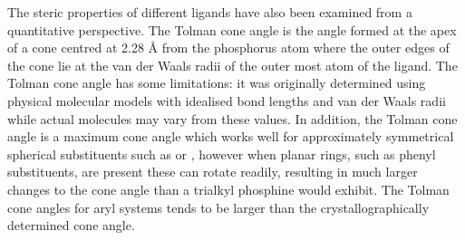 
The steric properties of different ligands have also been examined from a quantitative perspective.  The Tolman cone angle is the angle formed at the apex of a cone centred at 2.28 \si{\angstrom} from the phosphorus atom where the outer edges of the cone lie at the van der Waals radii of the outer most atom of the ligand.\cite{Tolman1970}  The Tolman cone angle has some limitations: it was originally determined using physical molecular models with idealised bond lengths and van der Waals radii while actual molecules may vary from these values.  In addition, the Tolman cone angle is a maximum cone angle which works well for approximately symmetrical spherical substituents such as  or , however when planar rings, such as phenyl substituents, are present these can rotate readily, resulting in much larger changes to the cone angle than a trialkyl phosphine would exhibit.  The Tolman cone angles for aryl systems tends to be larger than the crystallographically determined cone angle.

